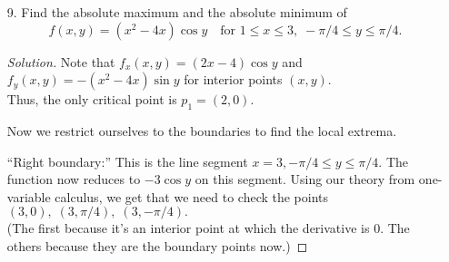 \documentclass[12pt]{article}
\theoremstyle{definition}
\newenvironment{soln}{\begin{proof}[Solution]}{\end{proof}}
\begin{document}
\begin{itemize}
\begin{soln}
\begin{enumerate}
		Thus, solving $(\nabla f)(x_0, y_0) = (0, 0)$ gives us that $(x_0, y_0) = (0, 0).$

		In our case, the discriminant at a general point is
		\begin{align*} 
			D &= f_{x x}\left(x_{0}, y_{0}\right) f_{y y}\left(x_{0}, y_{0}\right)-f_{x y}\left(x_{0}, y_{0}\right)^{2}\\
			&= -36(x_0^2 + y_0^2).
		\end{align*}

		Hence, we get that the discriminant test is {\color{red} inconclusive!} This means that we must turn to some other analytic methods of determining the nature.

		Now, we note that $f(x, 0) = x^3$ for all $x \in \mathbb{R}.$ This means that, given any $r > 0,$ we have
		\begin{equation*} 
			f\left(\frac{r}{2}, 0\right) > f(0, 0) > f\left(-\frac{r}{2}, 0\right).
		\end{equation*}
		However, note that
		\begin{equation*} 
			\left(-\frac{r}{2}, 0\right), \left(\frac{r}{2}, 0\right) \in D_r(0, 0).
		\end{equation*}
		Thus, $(0, 0)$ can neither be a point of local minima nor of local maxima.

		Thus, $(0, 0)$ is a saddle point, by definition.
		\end{enumerate}
	\end{soln}
	\newpage
	\item[9.] Find the absolute maximum and the absolute minimum of
	\begin{equation*} 
		f(x, y) = (x^2 - 4x)\cos y \quad\text{for } 1 \le x \le 3,\; -\pi/4 \le y \le \pi/4.
	\end{equation*}
	\begin{soln}
		Note that $f_x(x, y) = (2x-4) \cos y$ and $f_y(x, y) = -\left(x^{2}-4x\right) \sin y$ for interior points $(x, y).$\\
		Thus, the only critical point is $p_1 = (2, 0).$

		Now we restrict ourselves to the boundaries to find the local extrema.

		``Right boundary:'' This is the line segment $x = 3, -\pi / 4 \leq y \leq \pi / 4.$ The function now reduces to $-3\cos y$ on this segment. Using our theory from one-variable calculus, we get that we need to check the points $(3, 0),\;(3, \pi/4),\;(3, -\pi/4).$\\
		(The first because it's an interior point at which the derivative is $0.$ The others because they are the boundary points now.)


\end{soln}
\end{itemize}
\end{document}
